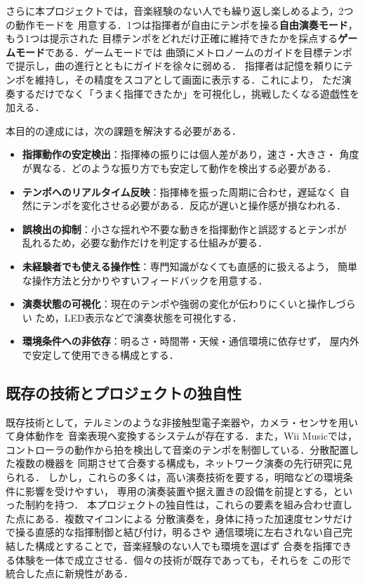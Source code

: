 \documentclass[lualatex,book,paper=a4paper,jafontsize=11.5pt,jafontscale=1.05]{jlreq}
\begin{document}
さらに本プロジェクトでは，音楽経験のない人でも繰り返し楽しめるよう，2つの動作モードを
用意する．1つは指揮者が自由にテンポを操る\textbf{自由演奏モード}，もう1つは提示された
目標テンポをどれだけ正確に維持できたかを採点する\textbf{ゲームモード}である．ゲームモードでは
曲頭にメトロノームのガイドを目標テンポで提示し，曲の進行とともにガイドを徐々に弱める．
指揮者は記憶を頼りにテンポを維持し，その精度をスコアとして画面に表示する．これにより，
ただ演奏するだけでなく「うまく指揮できたか」を可視化し，挑戦したくなる遊戯性を加える．

本目的の達成には，次の課題を解決する必要がある．
\begin{itemize}
  \item \textbf{指揮動作の安定検出}：指揮棒の振りには個人差があり，速さ・大きさ・
        角度が異なる．どのような振り方でも安定して動作を検出する必要がある．
  \item \textbf{テンポへのリアルタイム反映}：指揮棒を振った周期に合わせ，遅延なく
        自然にテンポを変化させる必要がある．反応が遅いと操作感が損なわれる．
  \item \textbf{誤検出の抑制}：小さな揺れや不要な動きを指揮動作と誤認するとテンポが
        乱れるため，必要な動作だけを判定する仕組みが要る．
  \item \textbf{未経験者でも使える操作性}：専門知識がなくても直感的に扱えるよう，
        簡単な操作方法と分かりやすいフィードバックを用意する．
  \item \textbf{演奏状態の可視化}：現在のテンポや強弱の変化が伝わりにくいと操作しづらい
        ため，LED表示などで演奏状態を可視化する．
  \item \textbf{環境条件への非依存}：明るさ・時間帯・天候・通信環境に依存せず，
        屋内外で安定して使用できる構成とする．
\end{itemize}

\subsection{既存の技術とプロジェクトの独自性}
既存技術として，テルミンのような非接触型電子楽器や，カメラ・センサを用いて身体動作を
音楽表現へ変換するシステムが存在する\cite{teru}．また，Wii Music\cite{ninntenndo}では，
コントローラの動作から拍を検出して音楽のテンポを制御している．分散配置した複数の機器を
同期させて合奏する構成も，ネットワーク演奏の先行研究\cite{ref:chien}に見られる．
しかし，これらの多くは，高い演奏技術を要する，明暗などの環境条件に影響を受けやすい，
専用の演奏装置や据え置きの設備を前提とする，といった制約を持つ．
本プロジェクトの独自性は，これらの要素を組み合わせ直した点にある．複数マイコンによる
分散演奏を，身体に持った加速度センサだけで操る直感的な指揮制御と結び付け，明るさや
通信環境に左右されない自己完結した構成とすることで，音楽経験のない人でも環境を選ばず
合奏を指揮できる体験を一体で成立させる．個々の技術が既存であっても，それらを
この形で統合した点に新規性がある．
\end{document}
